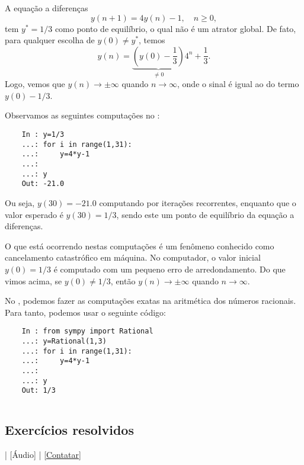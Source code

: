 \begin{ex}
  A equação a diferenças
  \begin{equation}
    y(n+1) = 4y(n) - 1,\quad n\geq 0,
  \end{equation}
  tem $y^* = 1/3$ como ponto de equilíbrio, o qual não é um atrator global. De fato, para qualquer escolha de $y(0)\neq y^*$, temos
  \begin{equation}
    y(n) = \underbrace{\left(y(0) - \frac{1}{3}\right)}_{\neq 0}4^n + \frac{1}{3}.
  \end{equation}
  Logo, vemos que $y(n)\to\pm\infty$ quando $n\to\infty$, onde o sinal é igual ao do termo $y(0)-1/3$.

  \ifispython
  Observamos as seguintes computações no \python:
  \begin{lstlisting}
    In : y=1/3
    ...: for i in range(1,31):
    ...:     y=4*y-1
    ...: 
    ...: y
    Out: -21.0
  \end{lstlisting}
  Ou seja, $y(30)=-21.0$ computando por iterações recorrentes, enquanto que o valor esperado é $y(30)=1/3$, sendo este um ponto de equilíbrio da equação a diferenças.

  O que está ocorrendo nestas computações é um fenômeno conhecido como cancelamento catastrófico em máquina. No computador, o valor inicial $y(0)=1/3$ é computado com um pequeno erro de arredondamento. Do que vimos acima, se $y(0)\neq 1/3$, então $y(n)\to\pm\infty$ quando $n\to\infty$.

  No \python, podemos fazer as computações exatas na aritmética dos números racionais. Para tanto, podemos usar o seguinte código:
  \begin{lstlisting}
    In : from sympy import Rational
    ...: y=Rational(1,3)
    ...: for i in range(1,31):
    ...:     y=4*y-1
    ...: 
    ...: y
    Out: 1/3
  \end{lstlisting}
  \begin{lstlisting}

  \end{lstlisting}
  \fi
\end{ex}

\subsection*{Exercícios resolvidos}

\begin{flushright}
  [Vídeo] | [Áudio] | \href{https://phkonzen.github.io/notas/contato.html}{[Contatar]}
\end{flushright}

